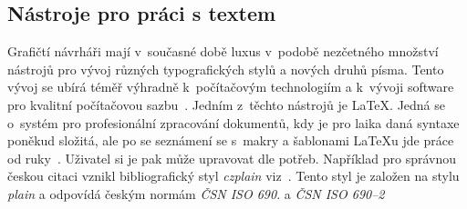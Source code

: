 \documentclass[a4paper, 11pt]{article}
\begin{document}
	\subsection*{Nástroje pro práci s textem}
	Grafičtí návrháři mají v~současné době luxus v~podobě nezčetného množství nástrojů pro vývoj různých typografických stylů a nových druhů písma. Tento vývoj se ubírá téměř výhradně k~počítačovým technologiím a k~vývoji software pro kvalitní počítačovou sazbu~\cite{CA:Future_of_typography}. Jedním z~těchto nástrojů je \LaTeX. Jedná se o~systém pro profesionální zpracování dokumentů, kdy je pro laika daná syntaxe poněkud složitá, ale po se seznámení se s~makry a šablonami \LaTeX u jde práce od ruky~\cite{Martinek:LaTeX}. Uživatel si je pak může upravovat dle potřeb. Například pro správnou českou citaci vznikl bibliografický styl \emph{czplain} viz~\cite{Pysny:BiBTeX}. Tento styl je založen na stylu \emph{plain} a odpovídá českým normám \emph{ČSN ISO 690}. a \emph{ČSN ISO 690--2}
	
	
	
	
	\newpage
	
\end{document}
